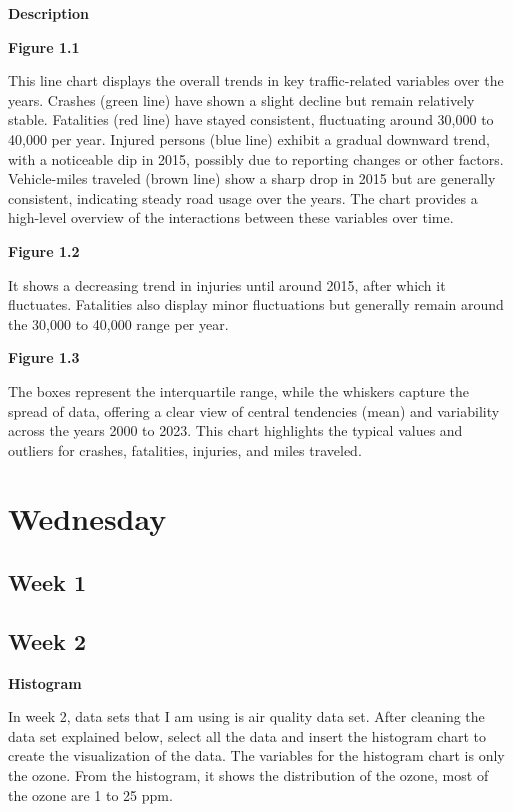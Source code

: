 \documentclass[
  letterpaper,
  DIV=11,
  numbers=noendperiod]{scrreprt}
\begin{document}
\textbf{Description}

\textbf{Figure 1.1}

This line chart displays the overall trends in key traffic-related
variables over the years. Crashes (green line) have shown a slight
decline but remain relatively stable. Fatalities (red line) have stayed
consistent, fluctuating around 30,000 to 40,000 per year. Injured
persons (blue line) exhibit a gradual downward trend, with a noticeable
dip in 2015, possibly due to reporting changes or other factors.
Vehicle-miles traveled (brown line) show a sharp drop in 2015 but are
generally consistent, indicating steady road usage over the years. The
chart provides a high-level overview of the interactions between these
variables over time.

\textbf{Figure 1.2}

It shows a decreasing trend in injuries until around 2015, after which
it fluctuates. Fatalities also display minor fluctuations but generally
remain around the 30,000 to 40,000 range per year.

\textbf{Figure 1.3}

The boxes represent the interquartile range, while the whiskers capture
the spread of data, offering a clear view of central tendencies (mean)
and variability across the years 2000 to 2023. This chart highlights the
typical values and outliers for crashes, fatalities, injuries, and miles
traveled.

\section{Wednesday}\label{wednesday}

\subsection{Week 1}\label{week-1}

\subsection{Week 2}\label{week-2}

\textbf{Histogram}

In week 2, data sets that I am using is air quality data set. After
cleaning the data set explained below, select all the data and insert
the histogram chart to create the visualization of the data. The
variables for the histogram chart is only the ozone. From the histogram,
it shows the distribution of the ozone, most of the ozone are 1 to 25
ppm.
\end{document}
